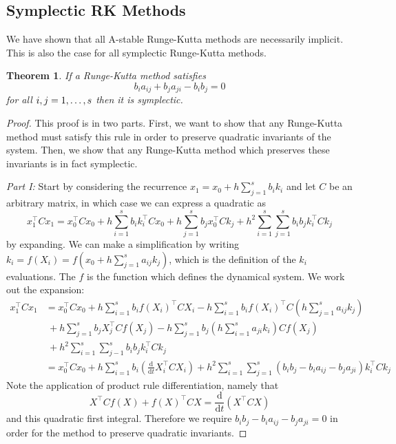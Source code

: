 \documentclass{report}
\newtheorem{theorem}{Theorem}[chapter]
\theoremstyle{exampstyle} \newtheorem{example}[theorem]{Example}
\theoremstyle{exampstyle} \newtheorem{remark}[theorem]{Remark}
\theoremstyle{exampstyle} \newtheorem{definition}[theorem]{Definition}
\theoremstyle{exampstyle} \newtheorem{lemma}[theorem]{Lemma}
\begin{document}
\subsection{Symplectic RK Methods}

We have shown that all A-stable Runge-Kutta methods are necessarily implicit.
This is also the case for all symplectic Runge-Kutta methods.

\begin{theorem}
\label{thm:symrk}
If a Runge-Kutta method satisfies
\begin{equation}
	b_i a_{ij} + b_j a_{ji} - b_i b_j = 0
\end{equation}
for all $i, j = 1, \mathellipsis, s$ then it is symplectic.
\end{theorem}
\begin{proof}

This proof is in two parts. First, we want to show that any Runge-Kutta method must satisfy this rule in order to preserve quadratic invariants of the system.
Then, we show that any Runge-Kutta method which preserves these invariants is in fact symplectic.

\textit{Part I:}
Start by considering the recurrence $x_1 = x_0 + h \sum_{j=1}^{s} b_i k_i$ and let $C$ be an arbitrary matrix, in which case we can express a quadratic as
\begin{equation}
	x_1^\intercal C x_1 = x_0^\intercal C x_0 + h \sum_{i=1}^{s} b_i k_i^\intercal C x_0 + h \sum_{j=1}^{s} b_j x_0^\intercal C k_j + h^2 \sum_{i=1}^{s} \sum_{j=1}^{s} b_i b_j k_i^\intercal C k_j
\end{equation} %
by expanding. We can make a simplification by writing $k_i = f(X_i) = f\left(x_0 + h \sum_{j=1}^{s}a_{ij}k_j\right)$, which is the definition of the $k_i$ evaluations.
The $f$ is the function which defines the dynamical system.
We work out the expansion:
\begin{align*}
	x_1^\intercal C x_1 &= x_0^\intercal C x_0 + h \sum_{i = 1}^{s} b_i f(X_i)^\intercal C X_i - h \sum_{i=1}^{s}b_i f(X_i)^\intercal C \left( h\sum_{j=1}^{s}a_{ij} k_j \right) \\
	&~ +h \sum_{j = 1}^{s} b_j X_j^\intercal C f(X_j) - h \sum_{j=1}^{s}b_j \left( h\sum_{i=1}^{s}a_{ji} k_i \right) C f(X_j) \\
	&~ + h^2 \sum_{i=1}^{s} \sum_{j-1}^{s} b_i b_j k_i^\intercal C k_j \\
	&= x_0^\intercal C x_0 + h \sum_{i=1}^{s} b_i \left(
		\frac{\mathrm{d}}{\mathrm{d}t} X_i^\intercal C X_i
	\right) + h^2 \sum_{i=1}^{s} \sum_{j=1}^{s} (b_i b_j - b_i a_{ij} - b_j a_{ji})k_i^\intercal C k_j
\end{align*}
Note the application of product rule differentiation, namely that
\begin{equation*}
	X^\intercal C f(X) + f(X)^\intercal C X = \frac{\mathrm{d}}{\mathrm{d}t} (X^\intercal C X)
\end{equation*}
and this quadratic first integral.
Therefore we require $b_i b_j - b_i a_{ij} - b_j a_{ji} = 0$ in order for the method to preserve quadratic invariants.


\end{proof}
\end{document}
